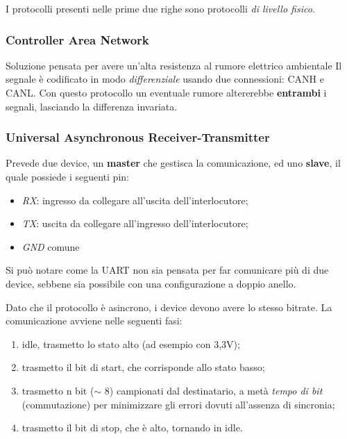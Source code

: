 \documentclass[
]{book}
\providecommand{\tightlist}{%
  \setlength{\itemsep}{0pt}\setlength{\parskip}{0pt}}
\begin{document}
I protocolli presenti nelle prime due righe sono protocolli \emph{di
livello fisico}.

\subsubsection{Controller Area Network}\label{controller-area-network}

Soluzione pensata per avere un'alta resistenza al rumore elettrico
ambientale \newline Il segnale è codificato in modo \emph{differenziale}
usando due connessioni: CANH e CANL. Con questo protocollo un eventuale
rumore altererebbe \textbf{entrambi} i segnali, lasciando la differenza
invariata.

\subsubsection{Universal Asynchronous
Receiver-Transmitter}\label{universal-asynchronous-receiver-transmitter}

Prevede due device, un \textbf{master} che gestisca la comunicazione, ed
uno \textbf{slave}, il quale possiede i seguenti pin:

\begin{itemize}
\tightlist
\item
  \emph{RX}: ingresso da collegare all'uscita dell'interlocutore;
\item
  \emph{TX}: uscita da collegare all'ingresso dell'interlocutore;
\item
  \emph{GND} comune
\end{itemize}

Si può notare come la UART non sia pensata per far comunicare più di due
device, sebbene sia possibile con una configurazione a doppio anello.

Dato che il protocollo è asincrono, i device devono avere lo stesso
bitrate. La comunicazione avviene nelle seguenti fasi:

\begin{enumerate}
\def\labelenumi{\arabic{enumi})}
\setcounter{enumi}{-1}
\tightlist
\item
  idle, trasmetto lo stato alto (ad esempio con 3,3V);
\item
  trasmetto il bit di start, che corrisponde allo stato basso;
\item
  trasmetto n bit (\(\sim\) 8) campionati dal destinatario, a metà
  \emph{tempo di bit} (commutazione) per minimizzare gli errori dovuti
  all'assenza di sincronia;
\item
  trasmetto il bit di stop, che è alto, tornando in idle.
\end{enumerate}
\end{document}
